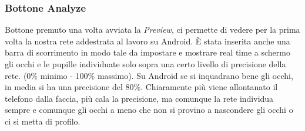 \documentclass[11pt]{article}
\begin{document}
\newpage
\subsubsection{Bottone Analyze}
\label{ssu:ana}
Bottone premuto una volta avviata la \textit{Preview}, ci permette di vedere per la prima volta la nostra rete addestrata al lavoro su Android.
È stata inserita anche una barra di scorrimento in modo tale da impostare e mostrare real time a schermo gli occhi e le pupille individuate solo sopra una certo livello di precisione della rete. (0\% minimo - 100\% massimo). Su Android se si inquadrano bene gli occhi, in media si ha una precisione del 80\%. 
\newline
Chiaramente più viene allontanato il telefono dalla faccia, più cala la precisione, ma comunque la rete individua sempre e comunque gli occhi a meno che non si provino a nascondere gli occhi o ci si metta di profilo.
\end{document}
